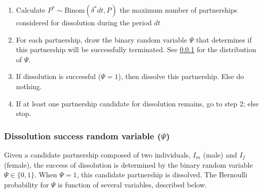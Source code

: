 \documentclass[11pt, onecolumn]{article}
\begin{document}
\begin{enumerate}
\item Calculate $P^* \sim \text{Binom}(\delta^*dt, P)$ the maximum number of partnerships considered for dissolution during the period $dt$

\item For each partnership, draw the binary random variable $\Psi$ that determines if this partnership will be successfully terminated. See \ref{dissolutionSuccessFormula} for the distribution of $\Psi$.

\item If dissolution is successful ($\Psi=1$), then dissolve this partnership. Else do nothing.

\item If at least one partnership candidate for dissolution remains, go to step 2; else stop.

\end{enumerate}

\subsubsection{Dissolution success random variable ($\Psi$)}
\label{dissolutionSuccessFormula}

Given a candidate partnership composed of two individuals, $I_m$ (male) and $I_f$ (female), the success of dissolution is determined by the binary random variable $\Psi\in\{0,1\}$. When $\Psi=1$, this candidate partnership is dissolved. The Bernoulli probability for $\Psi$ is function of several variables, described below.
\end{document}
